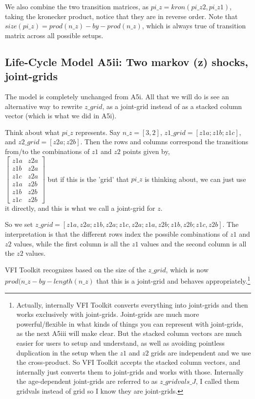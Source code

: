 We also combine the two transition matrices, as $pi\_{}z=kron(pi\_{}z2,pi\_{}z1)$, taking the kronecker product, notice that they are in reverse order. Note that $size(pi\_{}z)=prod(n\_{}z)-by-prod(n\_{}z)$, which is always true of transition matrix across all possible setups.


\subsection{Life-Cycle Model A5ii: Two markov (z) shocks, joint-grids}
The model is completely unchanged from A5i. All that we will do is see an alternative way to rewrite $z\_{}grid$, as a joint-grid instead of as a stacked column vector (which is what we did in A5i).

Think about what $pi\_{}z$ represents. Say $n\_{}z=[3,2]$, $z1\_{}grid=[z1a;z1b;z1c]$, and $z2\_{}grid=[z2a; z2b]$. Then the rows and columns correspond the transitions from/to the combinations of $z1$ and $z2$ points given by,
\\ $\begin{bmatrix}
 z1a & z2a \\
 z1b & z2a \\
 z1c & z2a \\
 z1a & z2b \\
 z1b & z2b \\
 z1c & z2b
\end{bmatrix}$
but if this is the 'grid' that $pi\_{}z$ is thinking about, we can just use it directly, and this is what we call a joint-grid for $z$.

So we set $z\_{}grid=[z1a,z2a; z1b,z2a; z1c,z2a; z1a,z2b; z1b,z2b; z1c,z2b]$. The interpretation is that the different rows index the possible combinations of $z1$ and $z2$ values, while the first column is all the $z1$ values and the second column is all the $z2$ values.

VFI Toolkit recognizes based on the size of the $z\_{}grid$, which is now $prod(n\_{}z-by-length(n\_{}z)$ that this is a joint-grid and behaves appropriately.\footnote{Actually, internally VFI Toolkit converts everything into joint-grids and then works exclusively with joint-grids. Joint-grids are much more powerful/flexible in what kinds of things you can represent with joint-grids, as the next A5iii will make clear. But the stacked column vectors are much easier for users to setup and understand, as well as avoiding pointless duplication in the setup when the $z1$ and $z2$ grids are independent and we use the cross-product. So VFI Toolkit accepts the stacked column vectors, and internally just converts them to joint-grids and works with those. Internally the age-dependent joint-grids are referred to as $z\_{}gridvals\_{}J$, I called them gridvals instead of grid so I know they are joint-grids.}

